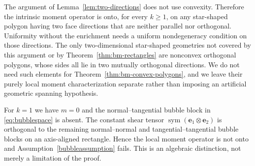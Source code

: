 \documentclass[review,hidelinks,onefignum,onetabnum]{siamart251216}
\newcommand{\sym}{\operatorname{sym}}
\begin{document}
\begin{remark}\label{rem:star-shaped-generic}
The argument of Lemma~\ref{lem:two-directions} does not use convexity.
Therefore the intrinsic moment operator is onto, for every $k\ge1$,
on any star-shaped polygon having two face directions that are neither
parallel nor orthogonal. Uniformity without the enrichment needs a
uniform nondegeneracy condition on those directions.  The only two-dimensional star-shaped geometries
not covered by this argument or by Theorem~\ref{thm:bm-rectangles} are
nonconvex orthogonal polygons, whose sides all lie in two mutually
orthogonal directions.  We do not need such elements for
Theorem~\ref{thm:bm-convex-polygons}, and we leave their purely local moment
characterization separate rather than imposing an artificial geometric
spanning hypothesis.
\end{remark}

\begin{remark}[Why the unenriched $k=1$ space is different on rectangles]\label{rem:rect-k1-failure}
For $k=1$ we have $m=0$ and the normal--tangential bubble block in
\eqref{eq:bubblespace} is absent.  The constant shear tensor
$\sym(\boldsymbol e_1\otimes\boldsymbol e_2)$ is orthogonal to the remaining
normal--normal and tangential--tangential bubble blocks on an axis-aligned
rectangle.  Hence the local moment operator is not onto and
Assumption~\ref{bubbleassumption} fails.  This is an algebraic distinction,
not merely a limitation of the proof.
\end{remark}
\end{document}
